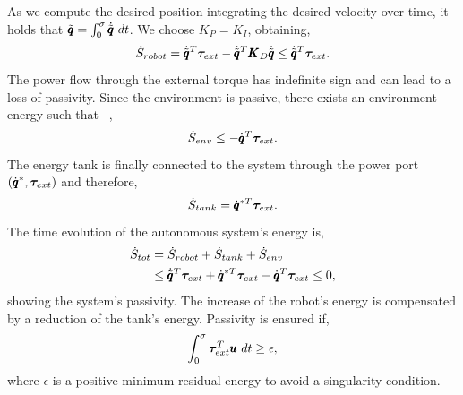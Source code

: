 As we compute the desired position integrating the desired velocity over time, it holds that $\tilde{\pmb{q}} = \int^{\sigma}_{0}
\dot{\tilde{\pmb{q}}}\ dt$. We choose $K_P = K_I$, obtaining,
\begin{equation}
    \dot{S}_{robot} = \dot{\tilde{\pmb{q}}}^T \boldsymbol{\tau}_{ext} - \dot{\tilde{\pmb{q}}}^T \pmb{K}_D \dot{\tilde{\pmb{q}}} \leq \dot{\tilde{\pmb{q}}}^T \boldsymbol{\tau}_{ext}. 
\end{equation}
The power flow through the external torque has indefinite sign and can lead to a loss of passivity. Since the environment is passive, there exists an environment energy such that ~\cite{shahriari2018valve},
\begin{equation}
    \dot{S}_{env} \leq -\dot{\pmb{q}}^T \boldsymbol{\tau}_{ext}.
\end{equation}
The energy tank is finally connected to the system through the power port $(\dot{\pmb{q}}^*, \boldsymbol{\tau}_{ext})$ and therefore,
\begin{equation} \label{eq:tank_dynamics}
\dot{S}_{tank} = \dot{\pmb{q}}^{*T} \boldsymbol{\tau}_{ext}. 
\end{equation}
The time evolution of the autonomous system's energy is,
\begin{equation}
\begin{aligned}
    \dot{S}_{tot} &= \dot{S}_{robot} + \dot{S}_{tank} + \dot{S}_{env} \\
    &\leq \dot{\tilde{\pmb{q}}}^T \boldsymbol{\tau}_{ext} + \dot{\pmb{q}}^{*T} \boldsymbol{\tau}_{ext} - \dot{\pmb{q}}^T \boldsymbol{\tau}_{ext} \leq 0,
\end{aligned}
\end{equation}
showing the system's passivity. The increase of the robot's energy is compensated by a reduction of the tank's energy. Passivity is ensured if,
\begin{equation}
    \int_{0}^{\sigma} \boldsymbol{\tau}_{ext}^T \pmb{u} \ dt \geq \epsilon,
\end{equation}
where $\epsilon$ is a positive minimum residual energy to avoid a singularity condition.

